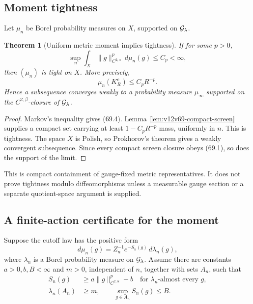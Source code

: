 \documentclass[11pt]{article}
\newtheorem{theorem}{Theorem}[section]
\theoremstyle{remark}
\begin{document}
\subsection{Moment tightness}

Let \(\mu_n\) be Borel probability measures on \(X\), supported on
\({\cal G}_\lambda\).

\begin{theorem}[Uniform metric moment implies tightness]
\label{thm:v12v69-moment-tightness}
If for some \(p>0\),
\begin{equation}
 \sup_n\int_X\|g\|_{C^{2,\alpha}}^p\,d\mu_n(g)
 \leq C_p<\infty,                                 \tag{69.3}
\end{equation}
then \((\mu_n)\) is tight on \(X\).  More precisely,
\begin{equation}
                         \mu_n(K_R^c)\leq C_pR^{-p}.           \tag{69.4}
\end{equation}
Hence a subsequence converges weakly to a probability measure
\(\mu_\infty\) supported on the \(C^{2,\beta}\)-closure of
\({\cal G}_\lambda\).
\end{theorem}

\begin{proof}
Markov's inequality gives (69.4).  Lemma
\ref{lem:v12v69-compact-screen} supplies a compact set carrying at
least \(1-C_pR^{-p}\) mass, uniformly in \(n\).  This is tightness.
The space \(X\) is Polish, so Prokhorov's theorem gives a weakly
convergent subsequence.  Since every compact screen closure obeys
(69.1), so does the support of the limit.
\end{proof}

This is compact containment of gauge-fixed metric representatives.
It does not prove tightness modulo diffeomorphisms unless a
measurable gauge section or a separate quotient-space argument is
supplied.

\subsection{A finite-action certificate for the moment}

Suppose the cutoff law has the positive form
\begin{equation}
 d\mu_n(g)
 =
 Z_n^{-1}e^{-S_n(g)}\,d\lambda_n(g),              \tag{69.5}
\end{equation}
where \(\lambda_n\) is a Borel probability measure on
\({\cal G}_\lambda\).  Assume there are constants
\(a>0,b,B<\infty\) and \(m>0\), independent of \(n\), together with
sets \(A_n\), such that
\begin{align}
 S_n(g)&\geq
 a\|g\|_{C^{2,\alpha}}^p-b
 \quad\text{for }\lambda_n\text{-almost every }g, \tag{69.6}\\
 \lambda_n(A_n)&\geq m,\qquad
 \sup_{g\in A_n}S_n(g)\leq B.                     \tag{69.7}
\end{align}
\end{document}
